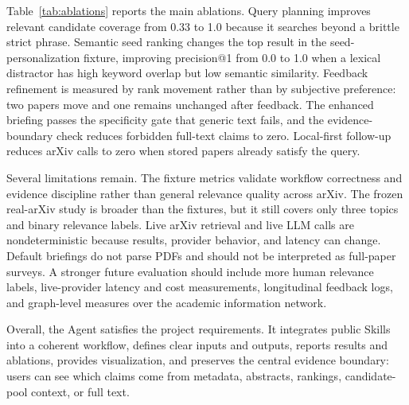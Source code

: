 \documentclass{article}
\begin{document}
Table~\ref{tab:ablations} reports the main ablations. Query planning improves relevant candidate coverage from 0.33 to 1.0 because it searches beyond a brittle strict phrase. Semantic seed ranking changes the top result in the seed-personalization fixture, improving precision@1 from 0.0 to 1.0 when a lexical distractor has high keyword overlap but low semantic similarity. Feedback refinement is measured by rank movement rather than by subjective preference: two papers move and one remains unchanged after feedback. The enhanced briefing passes the specificity gate that generic text fails, and the evidence-boundary check reduces forbidden full-text claims to zero. Local-first follow-up reduces arXiv calls to zero when stored papers already satisfy the query.

Several limitations remain. The fixture metrics validate workflow correctness and evidence discipline rather than general relevance quality across arXiv. The frozen real-arXiv study is broader than the fixtures, but it still covers only three topics and binary relevance labels. Live arXiv retrieval and live LLM calls are nondeterministic because results, provider behavior, and latency can change. Default briefings do not parse PDFs and should not be interpreted as full-paper surveys. A stronger future evaluation should include more human relevance labels, live-provider latency and cost measurements, longitudinal feedback logs, and graph-level measures over the academic information network.

Overall, the Agent satisfies the project requirements. It integrates public Skills into a coherent workflow, defines clear inputs and outputs, reports results and ablations, provides visualization, and preserves the central evidence boundary: users can see which claims come from metadata, abstracts, rankings, candidate-pool context, or full text.
\end{document}
